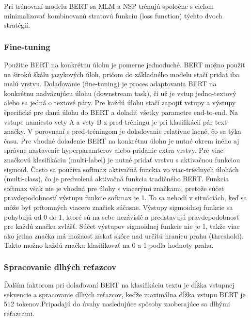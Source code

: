 Pri trénovaní modelu BERT sa MLM a NSP trénujú spoločne s cieľom minimalizovať kombinovanú stratovú funkciu (loss function) týchto dvoch stratégií. \cite{Horev:2019} \cite{Sun:2019} 

\subsubsection*{Fine-tuning} \label{finetuning}

Použitie BERT na konkrétnu úlohu je pomerne jednoduché. BERT možno použiť na širokú škálu jazykových úloh, pričom do základného modelu stačí pridať iba malú vrstvu. Dolaďovanie (fine-tuning) je proces adaptovania BERT na konkrétnu nadväzujúcu úlohu (downstream task), či už je vstup jedno-textový alebo sa jedná o textové páry. Pre každú úlohu stačí zapojiť vstupy a výstupy špecifické pre danú úlohu do BERT a doladiť všetky parametre end-to-end. Na vstupe namiesto vety A a vety B z pred-tréningu je pri klasifikácií pár text-značky. V porovnaní s pred-tréningom je dolaďovanie relatívne lacné, čo sa týka času. 
Pre vhodné doladenie BERT na konkrétnu úlohu je nutné okrem iného aj správne nastavenie hyperparamterov alebo pridanie extra vrstvy. Pre viac-značkovú klasifikáciu (multi-label) je nutné pridať vrstvu s aktivačnou funkciou sigmoid. Často sa používa softmax aktivačná funckia vo viac-triednych  úlohách (multi-class), čo je predvolená aktivačná funkcia tradičného BERT. Funkcia softmax však nie je vhodná pre úlohy s viacerými značkami, pretože súčet pravdepodobností výstupu funkcie softmax je 1. To sa nehodí v situáciách, keď sa môže byť prítomných viacero značiek súčasne.  Výstupy sigmoidnej funkcie sa pohybujú od 0 do 1, ktoré sú na sebe nezávislé a predstavujú pravdepodobnosť pre každú značku zvlášť. Súčet výstupov sigmoidnej funkcie nie je 1, takže viac ako jedna značka má možnosť získať skóre nad určitú hranicu prahu (threshold). Takto možno každú značku klasifikovať na 0 a 1 podľa hodnoty prahu.
\cite{Devlin:2018} \cite{Sun:2019} \cite{Tang:2020}

\subsubsection*{Spracovanie dlhých reťazcov} \label{dlhe}

Ďalším faktorom pri dolaďovaní BERT na klasifikáciu textu je dĺžka vstupnej sekvencie a spracovanie dlhých reťazcov, keďže maximálna dĺžka vstupu BERT je 512 tokenov.Pripadajú do úvahy nasledujúce spôsoby zaoberajúce sa dlhými reťazcami.

